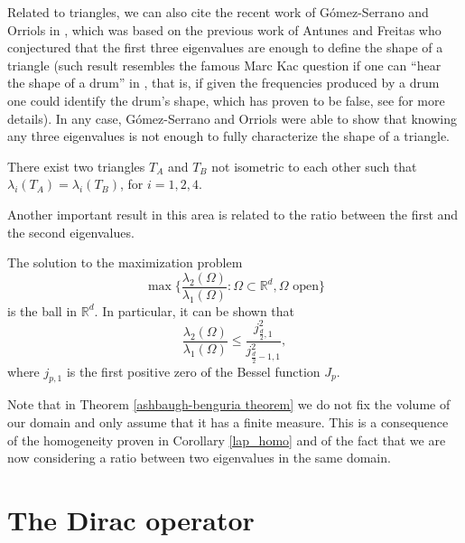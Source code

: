 Related to triangles, we can also cite the recent work of Gómez-Serrano and Orriols in \cite{gomez2021any}, which was based on the previous work of Antunes and Freitas \cite{antunes2011inverse} who conjectured that the first three eigenvalues are enough to define the shape of a triangle (such result resembles the famous Marc Kac question if one can ``hear the shape of a drum'' in \cite{kac1966can}, that is, if given the frequencies produced by a drum one could identify the drum's shape, which has proven to be false, see \cite{gordon1992isospectral} for more details). In any case, Gómez-Serrano and Orriols were able to show that knowing any three eigenvalues is not enough to fully characterize the shape of a triangle.
\begin{theorem}
    There exist two triangles \(T_A\) and \(T_B\) not isometric to each other such that \(\lambda_i(T_A) = \lambda_i(T_B)\), for \(i=1, 2, 4\).    
\end{theorem}

Another important result in this area is related to the ratio between the first and the second eigenvalues.
\begin{theorem}\label{ashbaugh-benguria theorem}
    The solution to the maximization problem
    \[
    \max \Big\{\frac{\lambda_2(\Omega)}{\lambda_1(\Omega)}: \Omega \subset \mathbb{R}^d, \Omega \text{ open} \Big\}
    \]
    is the ball in \(\mathbb{R}^d\). In particular, it can be shown that
    \[
    \frac{\lambda_2(\Omega)}{\lambda_1(\Omega)}  \leq \frac{j_{\frac{d}{2},1}^2}{j_{\frac{d}{2}-1,1}^2},
    \]
    where \(j_{p,1}\) is the first positive zero of the Bessel function \(J_p\).
\end{theorem}

\begin{remark}
    Note that in Theorem \ref{ashbaugh-benguria theorem} we do not fix the volume of our domain and only assume that it has a finite measure. This is a consequence of the homogeneity proven in Corollary \eqref{lap_homo} and of the fact that we are now considering a ratio between two eigenvalues in the same domain.
\end{remark}


\section{The Dirac operator}
 
